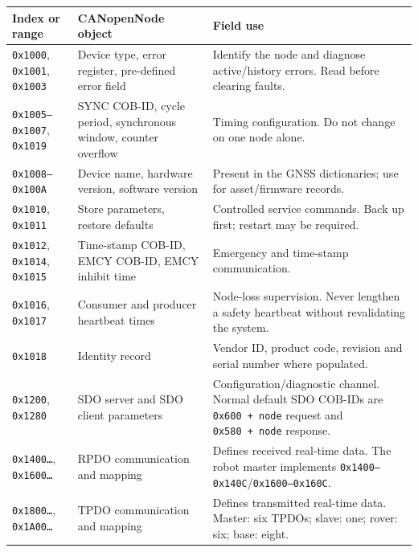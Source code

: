 \documentclass[
  10pt,
  letterpaper,
  openany]{report}
\newcounter{none} %
\begin{document}
{\def\LTcaptype{none} %
\begin{longtable}[]{@{}
  >{\raggedright\arraybackslash}p{}
  >{\raggedright\arraybackslash}p{}
  >{\raggedright\arraybackslash}p{}@{}}
\toprule\noalign{}
\begin{minipage}[b]{\linewidth}\raggedright
Index or range
\end{minipage} & \begin{minipage}[b]{\linewidth}\raggedright
CANopenNode object
\end{minipage} & \begin{minipage}[b]{\linewidth}\raggedright
Field use
\end{minipage} \\
\midrule\noalign{}
\endhead
\bottomrule\noalign{}
\endlastfoot
\texttt{0x1000}, \texttt{0x1001}, \texttt{0x1003} & Device type, error
register, pre-defined error field & Identify the node and diagnose
active/history errors. Read before clearing faults. \\
\texttt{0x1005–0x1007}, \texttt{0x1019} & SYNC COB-ID, cycle period,
synchronous window, counter overflow & Timing configuration. Do not
change on one node alone. \\
\texttt{0x1008–0x100A} & Device name, hardware version, software version
& Present in the GNSS dictionaries; use for asset/firmware records. \\
\texttt{0x1010}, \texttt{0x1011} & Store parameters, restore defaults &
Controlled service commands. Back up first; restart may be required. \\
\texttt{0x1012}, \texttt{0x1014}, \texttt{0x1015} & Time-stamp COB-ID,
EMCY COB-ID, EMCY inhibit time & Emergency and time-stamp
communication. \\
\texttt{0x1016}, \texttt{0x1017} & Consumer and producer heartbeat times
& Node-loss supervision. Never lengthen a safety heartbeat without
revalidating the system. \\
\texttt{0x1018} & Identity record & Vendor ID, product code, revision
and serial number where populated. \\
\texttt{0x1200}, \texttt{0x1280} & SDO server and SDO client parameters
& Configuration/diagnostic channel. Normal default SDO COB-IDs are
\texttt{0x600\ +\ node} request and \texttt{0x580\ +\ node} response. \\
\texttt{0x1400…}, \texttt{0x1600…} & RPDO communication and mapping &
Defines received real-time data. The robot master implements
\texttt{0x1400–0x140C}/\texttt{0x1600–0x160C}. \\
\texttt{0x1800…}, \texttt{0x1A00…} & TPDO communication and mapping &
Defines transmitted real-time data. Master: six TPDOs; slave: one;
rover: six; base: eight. \\
\end{longtable}
}
\end{document}
